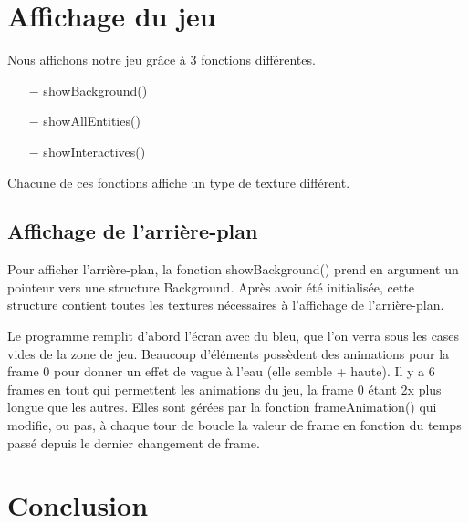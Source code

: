 \documentclass[french, 12pt]{article}
\begin{document}
\section{Affichage du jeu}


Nous affichons notre jeu grâce à 3 fonctions différentes.
\begin{itemize}
    \item[$-$] showBackground()
    \item[$-$] showAllEntities()
    \item[$-$] showInteractives()
\end{itemize}

Chacune de ces fonctions affiche un type de texture différent.

    \subsection{Affichage de l'arrière-plan}

    Pour afficher l'arrière-plan, la fonction showBackground() prend en argument un pointeur vers une structure Background. Après avoir été initialisée, cette structure contient toutes les textures nécessaires à l'affichage de l'arrière-plan.

    Le programme remplit d'abord l'écran avec du bleu, que l'on verra sous les cases vides de la zone de jeu.
    Beaucoup d'éléments possèdent des animations pour la frame 0 pour donner un effet de vague à l'eau (elle semble + haute).
    Il y a 6 frames en tout qui permettent les animations du jeu, la frame 0 étant 2x plus longue que les autres. Elles sont gérées par la fonction frameAnimation() qui modifie, ou pas, à chaque tour de boucle la valeur de frame en fonction du temps passé depuis le dernier changement de frame.


\section{Conclusion}
\end{document}
